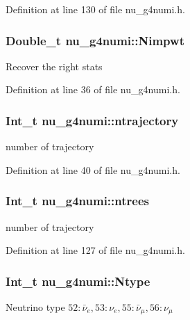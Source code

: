 Definition at line 130 of file nu\-\_\-g4numi.\-h.

\hypertarget{classnu__g4numi_ae9ebb4d9a2b72dd69f17143ce6e41da0}{
\subsubsection[{Nimpwt}]{\setlength{\rightskip}{0pt plus 5cm}Double\-\_\-t nu\-\_\-g4numi\-::\-Nimpwt}}\label{classnu__g4numi_ae9ebb4d9a2b72dd69f17143ce6e41da0}
Recover the right stats 

Definition at line 36 of file nu\-\_\-g4numi.\-h.

\hypertarget{classnu__g4numi_abdbe76af4b20f3b5b5b2fb4b92156b42}{
\subsubsection[{ntrajectory}]{\setlength{\rightskip}{0pt plus 5cm}Int\-\_\-t nu\-\_\-g4numi\-::ntrajectory}}\label{classnu__g4numi_abdbe76af4b20f3b5b5b2fb4b92156b42}
number of trajectory 

Definition at line 40 of file nu\-\_\-g4numi.\-h.

\hypertarget{classnu__g4numi_a7f79de08a1e588073904b69a1b10d35b}{
\subsubsection[{ntrees}]{\setlength{\rightskip}{0pt plus 5cm}Int\-\_\-t nu\-\_\-g4numi\-::ntrees}}\label{classnu__g4numi_a7f79de08a1e588073904b69a1b10d35b}
number of trajectory 

Definition at line 127 of file nu\-\_\-g4numi.\-h.

\hypertarget{classnu__g4numi_ab5167a93f34490c99c127d6f5292efb0}{
\subsubsection[{Ntype}]{\setlength{\rightskip}{0pt plus 5cm}Int\-\_\-t nu\-\_\-g4numi\-::\-Ntype}}\label{classnu__g4numi_ab5167a93f34490c99c127d6f5292efb0}
Neutrino type $ 52: \bar{\nu}_{e}, 53: \nu_{e}, 55: \bar{\nu}_{\mu}, 56: \nu_{\mu} $ 

